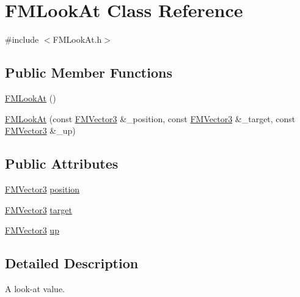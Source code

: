 \hypertarget{classFMLookAt}{
\section{FMLookAt Class Reference}
\label{classFMLookAt}
}


{\ttfamily \#include $<$FMLookAt.h$>$}

\subsection*{Public Member Functions}
\begin{DoxyCompactItemize}
\item 
\hyperlink{classFMLookAt_ade0b3f349d6f4cf3c37dd097f9e8cc47}{FMLookAt} ()
\item 
\hyperlink{classFMLookAt_a10b76b5f2d331ec5748ef72e15f9aba6}{FMLookAt} (const \hyperlink{classFMVector3}{FMVector3} \&\_\-position, const \hyperlink{classFMVector3}{FMVector3} \&\_\-target, const \hyperlink{classFMVector3}{FMVector3} \&\_\-up)
\end{DoxyCompactItemize}
\subsection*{Public Attributes}
\begin{DoxyCompactItemize}
\item 
\hyperlink{classFMVector3}{FMVector3} \hyperlink{classFMLookAt_ac6a935d152b60654e88e0d1eca5eaf75}{position}
\item 
\hyperlink{classFMVector3}{FMVector3} \hyperlink{classFMLookAt_a1921262a8c2d6074189fc9b3c4da2dcf}{target}
\item 
\hyperlink{classFMVector3}{FMVector3} \hyperlink{classFMLookAt_aad5d1c7f21b35add5956972669befd6e}{up}
\end{DoxyCompactItemize}


\subsection{Detailed Description}
A look-\/at value. 

